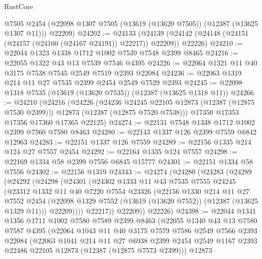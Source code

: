 \begin{lexlean}{RustCore}
\begin{coremodule}
      @7505
      @2454
      (@22098 @1307 @7505 (@13619 (@13620 @7505)) (@12387 (@13625 @1307 @11)))
      @22209)
@24202 := @24133
    (@24139 (@24142 (@24148 (@24151 (@24157 (@24160 (@24167 @24191)) @22217)) @22209)) @22226)
@24210 := @22044 @1323 @1338 @1712 @1002 @7539 @7548 @2399 @8465
@24216 := @22055 @1322 @43 @13 @7539 @7546 @4395
@24226 := @22064 @1321 @11 @40 @3175 @7538 @7545 @2549 @7519 @2393 @22084
@24236 := @22063 @1319 @214 @11 @27 @7535 @2399 @2454 @2549 @7529 @2393
@24245 := @22098 @1318 @7535 (@13619 (@13620 @7535)) (@12387 (@13625 @1318 @11))
@24266 := @24210
    (@24216
      (@24226
        (@24236 @24245 @22105 @12873 (@12387 (@12875 @7530 @2399)))
        @12873
        (@12387 (@12875 @7520 @7538)))
      @17350
      @17353
      @17356
      @17360
      @17365
      @22125)
@24274 := @22131 @7548 @1338 @1712 @1002 @2399 @7560 @7580 @8463
@24280 := @22143 @1337 @126 @2399 @7559 @6842 @12963
@24283 := @22151 @1337 @126 @7559
@24289 := @22156 @1335 @214 @124 @27 @7557 @2454
@24292 := @22164 @1335 @124 @7557
@24298 := @22169 @1334 @58 @2399 @7556 @6845 @15777
@24301 := @22151 @1334 @58 @7556
@24302 := @22156 @1319
@24343 := @24274
    (@24280
      (@24283
        (@24289
          (@24292
            (@24298
              (@24301
                (@24302
                  @1333
                  @11
                  @43
                  @7535
                  @7555
                  @24245
                  (@23312
                    @1332
                    @11
                    @40
                    @7220
                    @7554
                    @23326
                    (@22156
                      @1330
                      @214
                      @11
                      @27
                      @7552
                      @2454
                      (@22098 @1329 @7552 (@13619 (@13620 @7552)) (@12387 (@13625 @1329 @11)))
                      @22209))))
              @22217))
          @22209))
      @22226)
@24398 := @22044
    @1341
    @1356
    @1711
    @1002
    @7580
    @7589
    @2399
    @8463
    (@22055
      @1340
      @43
      @13
      @7580
      @7587
      @4395
      (@22064
        @1043
        @11
        @40
        @3175
        @7579
        @7586
        @2549
        @7566
        @2393
        @22084
        (@22063
          @1041
          @214
          @11
          @27
          @6938
          @2399
          @2454
          @2549
          @1167
          @2393
          @22486
          @22105
          @12873
          (@12387 (@12875 @7573 @2399)))
        @12873

\end{coremodule}
\end{lexlean}
